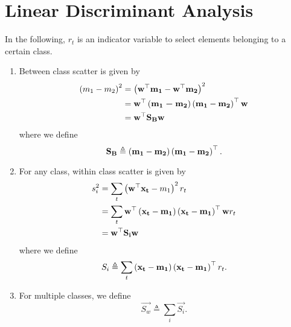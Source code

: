 \documentclass[twoside]{article}
\begin{document}



\section{Linear Discriminant Analysis}

In the following, \(r_t\) is an indicator variable to select elements belonging
to a certain class.

\begin{enumerate}
    \item Between class scatter is given by
    \begin{align}
        \left(m_1-m_2\right)^2 &= \left(\boldsymbol{\mathbf{w}}^\top\boldsymbol{\mathbf{m_1}} -
        \boldsymbol{\mathbf{w}}^\top\boldsymbol{\mathbf{m_2}}\right)^2 \\
                         &= \boldsymbol{\mathbf{w}}^\top \left(\boldsymbol{\mathbf{m_1-m_2}}\right)
                         \left(\boldsymbol{\mathbf{m_1}}-\boldsymbol{\mathbf{m_2}}\right)^\top \boldsymbol{\mathbf{w}} \\
                         &= \boldsymbol{\mathbf{w}}^\top \boldsymbol{\mathbf{S_Bw}}
                         \label{eq:bw-scatter}
    \end{align}
    where we define
    \begin{equation}
        \boldsymbol{\mathbf{S_B}} \triangleq \left(\boldsymbol{\mathbf{m_1}} - \boldsymbol{\mathbf{m_2}}\right) \left(\boldsymbol{\mathbf{m_1}} -
        \boldsymbol{\mathbf{m_2}}\right)^\top.
        \label{eq:S-b-def}
    \end{equation}

    \item For any class, within class scatter is given by
    \begin{align}
        s_i^2 &= \sum_t \left(\boldsymbol{\mathbf{w}}^\top\boldsymbol{\mathbf{x_t}} - m_1\right)^2 r_t \\
              &= \sum_t \boldsymbol{\mathbf{w}}^\top \left(\boldsymbol{\mathbf{x_t}}-\boldsymbol{\mathbf{m_1}}\right)
              \left(\boldsymbol{\mathbf{x_t}}-\boldsymbol{\mathbf{m_1}}\right)^\top \boldsymbol{\mathbf{w}} r_t \\
              &= \boldsymbol{\mathbf{w}}^\top\boldsymbol{\mathbf{S_iw}}
              \label{eq:in-scatter}
    \end{align}
    where we define
    \begin{equation}
        S_i \triangleq \sum_t \left(\boldsymbol{\mathbf{x_t}}-\boldsymbol{\mathbf{m_1}}\right)
        \left(\boldsymbol{\mathbf{x_t}}-\boldsymbol{\mathbf{m_1}}\right)^\top r_t.
        \label{eq:S-i-def}
    \end{equation}

    \item For multiple classes, we define
    \begin{equation}
        \vec{S_w} \triangleq \sum_i \vec{S_i}.
        \label{eq:S-w-def}
    \end{equation}
\end{enumerate}
\end{document}
